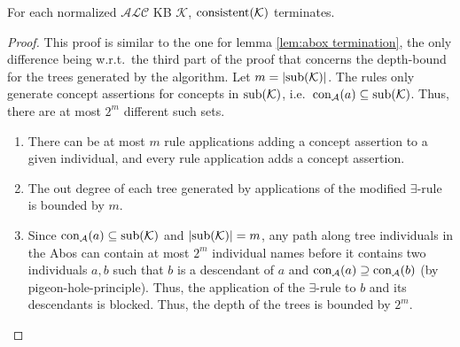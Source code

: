 \begin{lemma}[Termination]
	For each normalized $\mathcal{ALC}$ KB $\mathcal{K}$, $\operatorname{\text{consistent}}(\mathcal{K})$ terminates.
\end{lemma}
\begin{proof}
	This proof is similar to the one for lemma \ref{lem:abox termination},
	the only difference being w.r.t.\ the third part of the proof
	that concerns the depth-bound for the trees generated by the algorithm.
	Let $m = \lvert \operatorname{\text{sub}}(\mathcal{K}) \rvert$.
	The rules only generate concept assertions for concepts in $\operatorname{\text{sub}}(\mathcal{K})$,
	i.e.\ $\operatorname{\text{con}}_{\mathcal{A}}(a) \subseteq \operatorname{\text{sub}}(\mathcal{K})$.
	Thus, there are at most $2^m$ different such sets.
	\begin{enumerate}
		\item There can be at most $m$ rule applications adding a concept assertion to a given individual,
			and every rule application adds a concept assertion.
		\item The out degree of each tree generated by applications of the modified $\exists$-rule is bounded by $m$.
		\item Since $\operatorname{\text{con}}_{\mathcal{A}}(a) \subseteq \operatorname{\text{sub}}(\mathcal{K})$ and $\lvert \operatorname{\text{sub}}(\mathcal{K}) \rvert = m$,
			any path along tree individuals in the Abos can contain at most $2^m$ individual names
			before it contains two individuals $a, b$ such that $b$ is a descendant of $a$ and
			$\operatorname{\text{con}}_{\mathcal{A}}(a) \supseteq \operatorname{\text{con}}_{\mathcal{A}}(b)$ (by pigeon-hole-principle).
			Thus, the application of the $\exists$-rule to $b$ and its descendants is blocked.
			Thus, the depth of the trees is bounded by $2^m$.
			\qedhere
	\end{enumerate}
\end{proof}


